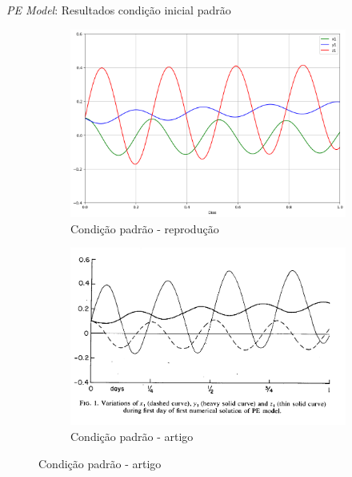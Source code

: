 \begin{frame}{\textit{PE Model}: Resultados condição inicial padrão}
   \begin{figure}
       \centering
       \begin{subfigure}[b]{0.45\textwidth}
           \centering
           \includegraphics[width=\textwidth]{img/p01d01.png}
           \caption{Condição padrão - reprodução}
           \label{fig:p01d01}
       \end{subfigure}
       \hfill
       \begin{subfigure}[b]{0.45\textwidth}
           \centering
           \includegraphics[width=\textwidth]{img/p01d01rel.png}
           \caption{Condição padrão - artigo}
           \label{fig:p01d01rel}
       \end{subfigure}
   \end{figure}
\end{frame}

